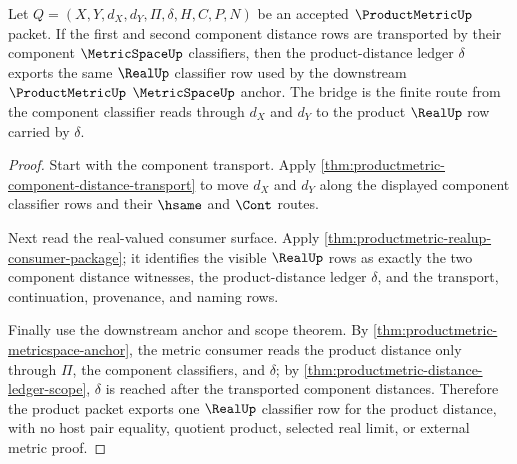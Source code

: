 \begin{theorem}
\label{thm:productmetric-real-classifier-bridge}
Let $Q=(X,Y,d_X,d_Y,\Pi,\delta,H,C,P,N)$ be an accepted $\ProductMetricUp$ packet. If the first and second component distance rows are transported by their component $\MetricSpaceUp$ classifiers, then the product-distance ledger $\delta$ exports the same $\RealUp$ classifier row used by the downstream $\ProductMetricUp$ $\MetricSpaceUp$ anchor. The bridge is the finite route from the component classifier reads through $d_X$ and $d_Y$ to the product $\RealUp$ row carried by $\delta$.
\end{theorem}
\begin{proof}
Start with the component transport. Apply \autoref{thm:productmetric-component-distance-transport} to move $d_X$ and $d_Y$ along the displayed component classifier rows and their $\hsame$ and $\Cont$ routes.

Next read the real-valued consumer surface. Apply \autoref{thm:productmetric-realup-consumer-package}; it identifies the visible $\RealUp$ rows as exactly the two component distance witnesses, the product-distance ledger $\delta$, and the transport, continuation, provenance, and naming rows.

Finally use the downstream anchor and scope theorem. By \autoref{thm:productmetric-metricspace-anchor}, the metric consumer reads the product distance only through $\Pi$, the component classifiers, and $\delta$; by \autoref{thm:productmetric-distance-ledger-scope}, $\delta$ is reached after the transported component distances. Therefore the product packet exports one $\RealUp$ classifier row for the product distance, with no host pair equality, quotient product, selected real limit, or external metric proof.
\end{proof}

